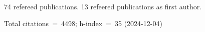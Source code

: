 74 refereed publications. 13 refeered publications as first author.

Total citations~=~4498; h-index~=~35 (2024-12-04)